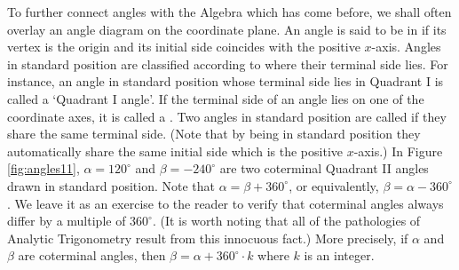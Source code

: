 To further connect angles with the Algebra which has come before, we shall often overlay an angle diagram on the coordinate plane.  An angle is said to be in  if its vertex is the origin and its initial side coincides with the positive $x$-axis.  Angles in standard position are classified according to where their terminal side lies.  For instance, an angle in standard position whose terminal side lies in Quadrant I is called a `Quadrant I angle'.  If the terminal side of an angle lies on one of the coordinate axes, it is called a .  Two angles in standard position are called  if they share the same terminal side. (Note that by being in standard position they automatically share the same initial side which is the positive $x$-axis.)  In Figure \ref{fig:angles11}, $\alpha = 120^{\circ}$ and $\beta = -240^{\circ}$ are two coterminal Quadrant II angles drawn in standard position.    Note that $\alpha = \beta + 360^{\circ}$, or equivalently, $\beta = \alpha - 360^{\circ}$. We leave it as an exercise to the reader to verify that coterminal angles always differ by a multiple of $360^{\circ}$. (It is worth noting that all of the pathologies of Analytic Trigonometry result from this innocuous fact.) More precisely, if $\alpha$ and $\beta$ are coterminal angles, then $\beta = \alpha + 360^{\circ} \cdot k$ where $k$ is an integer.



\medskip

